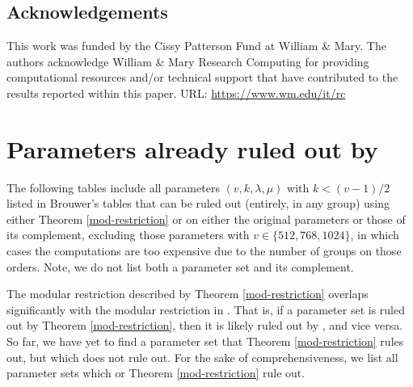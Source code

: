 \documentclass[12pt]{amsproc} %
\theoremstyle{definition}\newtheorem{defn}[thm]{Definition}
\theoremstyle{definition}\newtheorem{rem}[thm]{Remark}
\theoremstyle{definition}\newtheorem{ex}[thm]{Example}
\begin{document}
% 

\subsection*{Acknowledgements}
This work was funded by the Cissy Patterson Fund at William \& Mary. The authors acknowledge William \& Mary Research Computing for providing computational resources and/or technical support that have contributed to the results reported within this paper. URL: \url{https://www.wm.edu/it/rc}




\newpage

\appendix

\section{Parameters already ruled out by \texorpdfstring{\cite{swartz-tauscheck}}{[Swartz-Tauscheck]}}
\label{app:A}

The following tables include all parameters $(v, k, \lambda, \mu)$ with $k < (v-1)/2$ listed in Brouwer's tables \cite{brouwertables} that can be ruled out (entirely, in any group) using either Theorem \ref{mod-restriction} or \cite[Corollaries 5.2, 5.3]{swartz-tauscheck} on either the original parameters or those of its complement, excluding those parameters with $v \in \{512, 768, 1024\}$, in which cases the computations are too expensive due to the number of groups on those orders. Note, we do not list both a parameter set and its complement.

The modular restriction described by Theorem \ref{mod-restriction} overlaps significantly with the modular restriction in \cite[Corollaries 5.2, 5.3]{swartz-tauscheck}. That is, if a parameter set is ruled out by Theorem \ref{mod-restriction}, then it is likely ruled out by \cite[Corollaries 5.2, 5.3]{swartz-tauscheck}, and vice versa. So far, we have yet to find a parameter set that Theorem \ref{mod-restriction} rules out, but which \cite[Corollaries 5.2, 5.3]{swartz-tauscheck} does not rule out. For the sake of comprehensiveness, we list all parameter sets which \cite[Corollaries 5.2, 5.3]{swartz-tauscheck} or Theorem \ref{mod-restriction} rule out.
\end{document}

